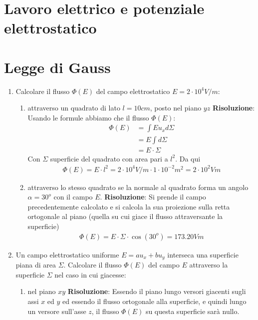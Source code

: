 \documentclass{book}
\begin{document}
\chapter{Lavoro elettrico e potenziale elettrostatico}



\chapter{Legge di Gauss}


\begin{enumerate}
    \item Calcolare il flusso $\Phi(E)$ del campo elettrostatico $E = 2 \cdot 10^4  V/m$:
    \begin{enumerate}
        \item attraverso un quadrato di lato $l = 10 cm$, posto nel piano $yz$ 
        \newline
        \textbf{Risoluzione}: Usando le formule abbiamo che il flusso $\Phi(E)$:
        \begin{align*}
            \Phi (E) & = \int E u_x d \Sigma \\
                     & = E \int d \Sigma \\
                     & = E \cdot \Sigma
        \end{align*}
        Con $\Sigma$ superficie del quadrato con area pari a $l^2$. Da qui 
        \begin{align*}
            \Phi (E) = E \cdot l^2 = 2 \cdot 10^4 V/m \cdot 1 \cdot 10^{-2} m^2 = 2 \cdot 10^2 Vm
        \end{align*}
        \item attraverso lo stesso quadrato se la normale al quadrato forma un angolo $\alpha = 30^o$ con il campo $E$.
        \newline
        \textbf{Risoluzione}: Si prende il campo precedentemente calcolato e si calcola la sua proiezione sulla retta ortogonale al piano (quella su cui giace il flusso attraversante la superficie)
        \begin{align*}
            \Phi (E) = E \cdot \Sigma \cdot \cos(30^o) = 173.20 Vm
        \end{align*}
    \end{enumerate}
    \item Un campo elettrostatico uniforme $E = au_x + bu_y$ interseca una superficie piana di area $\Sigma$. Calcolare il flusso $\Phi(E)$ del campo $E$ attraverso la superficie $\Sigma$ nel caso in cui giacesse:
    \begin{enumerate}
        \item nel piano $xy$
        \newline
        \textbf{Risoluzione}: Essendo il piano lungo versori giacenti sugli assi $x$ ed $y$ ed essendo il flusso ortogonale alla superficie, e quindi lungo un versore sull'asse $z$, il flusso $\Phi (E)$ su questa superficie sarà nullo.


\end{enumerate}
\end{enumerate}
\end{document}
